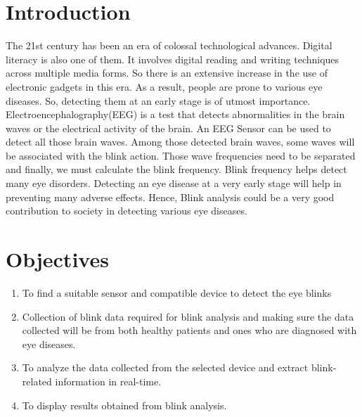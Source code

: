 
\section*{Introduction}
\graphicspath{{Introduction/IntroductionFigs/EPS/}{Introduction/IntroductionFigs/}}
The 21st century has been an era of colossal technological advances. Digital literacy is also one of them. It involves digital reading and writing techniques across multiple media forms. So there is an extensive increase in the use of electronic gadgets in this era. As a result, people are prone to various eye diseases. So, detecting them at an early stage is of utmost importance. 
Electroencephalography(EEG) is a test that detects abnormalities in the brain waves or the electrical activity of the brain. An EEG Sensor can be used to detect all those brain waves. Among those detected brain waves, some waves will be associated with the blink action. Those wave frequencies need to be separated and finally, we must calculate the blink frequency. 
Blink frequency helps detect many eye disorders. Detecting an eye disease at a very early stage will help in preventing many adverse effects. Hence, Blink analysis could be a very good contribution to society in detecting various eye diseases.
\section*{Objectives}
\begin{enumerate}
\item To find a suitable sensor and compatible device to detect the eye blinks
\item Collection of blink data required for blink analysis and making sure the data collected will be from both healthy patients and ones who are diagnosed with eye diseases.
\item To analyze the data collected from the selected device and extract blink-related information in real-time.
\item To display results obtained from blink analysis.
\end{enumerate}

